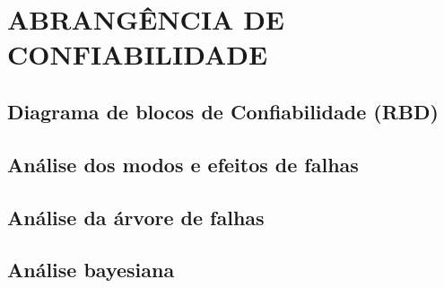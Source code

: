 \chapter{ABRANGÊNCIA DE CONFIABILIDADE}
\label{chap:abrconf}

\section{Diagrama de blocos de Confiabilidade (RBD)}
\label{sec:rbd}

\section{Análise dos modos e efeitos de falhas}
\label{sec:conffmeca}

\section{Análise da árvore de falhas}
\label{sec:conffta}

\section{Análise bayesiana}
\label{sec:bayes}


